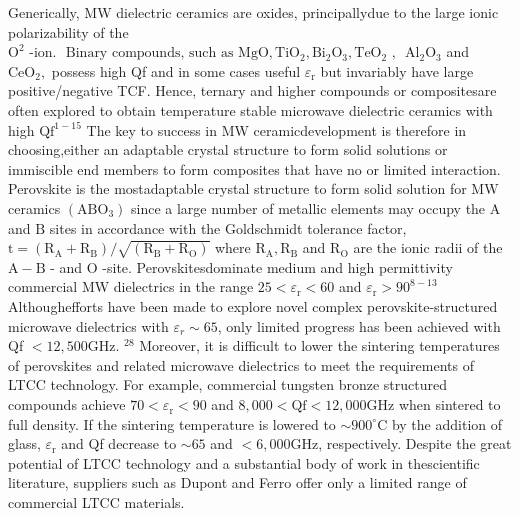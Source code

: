 \documentclass[a4paper,14pt]{extreport}
\begin{document}
Generically, MW dielectric ceramics are oxides, principallydue to the large ionic
polarizability of the $\mathrm{O}^{2} \text { -ion. } \text { Binary compounds, such as } \mathrm{MgO}, \mathrm{TiO}_{2}, \mathrm{Bi}_{2} \mathrm{O}_{3}, \mathrm{TeO}_{2} \text { , }$
$\mathrm{Al}_{2} \mathrm{O}_{3}$ and $\mathrm{CeO}_{2},{ }$ possess high Qf and in some cases useful $\varepsilon_{\mathrm{r}}$ but invariably have
large positive/negative TCF. Hence, ternary and higher compounds or compositesare
often explored to obtain temperature stable microwave dielectric ceramics with high
$\mathrm{Qf}^{1-15}$ The key to success in MW ceramicdevelopment is therefore in choosing,either
an adaptable crystal structure to form solid solutions or immiscible end members to
form composites that have no or limited interaction. Perovskite is the mostadaptable
crystal structure to form solid solution for $\mathrm{MW}$ ceramics $\left(\mathrm{ABO}_{3}\right)$ since a large number
of metallic elements may occupy the $\mathrm{A}$ and $\mathrm{B}$ sites in accordance with the
Goldschmidt tolerance factor, 
$\mathrm{t}=\left(\mathrm{R}_{\mathrm{A}}+\mathrm{R}_{\mathrm{B}}\right) / \sqrt{\left(\mathrm{R}_{\mathrm{B}}+\mathrm{R}_{\mathrm{O}}\right)}$
where $\mathrm{R}_{\mathrm{A}}, \mathrm{R}_{\mathrm{B}}$ and $\mathrm{R}_{\mathrm{O}}$ are the ionic radii of the $\mathrm{A}-\mathrm{B}$ - and $\mathrm{O}$ -site. Perovskitesdominate
medium and high permittivity commercial MW dielectrics in the range $25<\varepsilon_{\mathrm{r}}<60$
and $\varepsilon_{\mathrm{r}}>90^{8-13}$ Althoughefforts have been made to explore novel complex perovskite-structured microwave dielectrics with $\varepsilon_{r} \sim 65$, only limited progress has
been achieved with Qf $<12,500 \mathrm{GHz}$. ${ }^{28}$ Moreover, it is difficult to lower the sintering
temperatures of perovskites and related microwave dielectrics to meet the
requirements of LTCC technology. For example, commercial tungsten bronze
structured compounds achieve $70<\varepsilon_{\mathrm{r}}<90$ and $8,000<\mathrm{Qf}<12,000 \mathrm{GHz}$ when
sintered to full density. If the sintering temperature is lowered to $\sim 900^{\circ} \mathrm{C}$ by the
addition of glass, $\varepsilon_{\mathrm{r}}$ and Qf decrease to $\sim 65$ and $<6,000 \mathrm{GHz}$, respectively.  Despite
the great potential of LTCC technology and a substantial body of work in thescientific
literature, suppliers such as Dupont and Ferro offer only a limited range of
commercial LTCC materials. 
\end{document}
